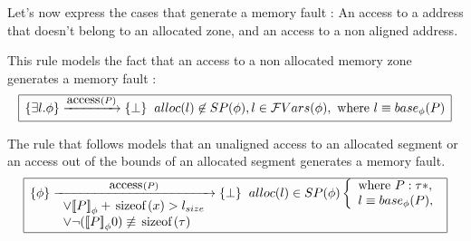 \documentclass[a4paper,twoside,12pt]{report}
\newcommand{\Sp}[1]{SP(#1)} %
\newcommand{\Alloc}[1]{alloc(#1)}
\newcommand{\FVars}[1]{\mathcal{F}Vars(#1)}
\newcommand{\base}[2]{base_{#1}(#2)}
\newcommand{\lsize}[1]{#1_{size}}
\newcommand{\transmodel}[4]{\lbrace #1 \rbrace \arrow{#2}{#3} \lbrace #4 \rbrace }
\newcommand{\seq}[0]{\equiv} %
\newcommand{\interpa}[2]{\sem{#2}_{#1}}
\newcommand{\sizeof}[1]{\mbox{\lstinline!sizeof!}(#1)}
\newcommand{\accs}[1]{\mbox{\lstinline!access!}(#1)}
\begin{document}
Let's now express the cases that generate a memory fault :
An access to a address that doesn't belong to an allocated zone, and
an access to a non aligned address.

This rule models the fact that an access to a non allocated memory zone generates a memory fault :
$$
\begin{array}{|l|}
\hline
\transmodel{\exists l. \phi}{\accs{P}}{}{\bot} \gspace  \Alloc{l}\not \in \Sp{\phi}, l \in \FVars{\phi}, \mbox{ where } l \seq \base{\phi}{P} \\
\hline
\end{array}
$$

The rule that follows models that an unaligned access to an allocated segment
or an access out of the bounds of an allocated segment generates a memory fault.
$$
\begin{array}{|l|}
\hline
\transmodel{\phi}{\accs{P}}{
\begin{array}{l}
\vee  \interpa{\phi}{P}+\sizeof{x} > \lsize{l} \\
\vee \neg (\interpa{\phi}{P}{0})\not\equiv \sizeof{\tau}
\end{array}
}{\bot} \gspace \Alloc{l}\in \Sp{\phi} \left \lbrace  \begin{array}{l} \mbox{where } P:\tau *,\\ l\seq\base{\phi}{P},\\ \end{array} \right . \\
\hline
\end{array}
$$
\end{document}
